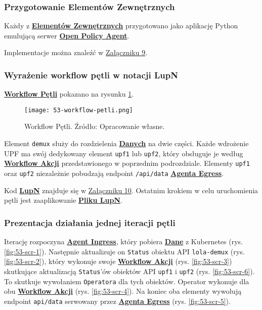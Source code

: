 \subsubsection{Przygotowanie Elementów Zewnętrznych}

Każdy z \hyperlink{def:element-zewnetrzny}{\textbf{Elementów Zewnętrznych}} przygotowano jako aplikację Python emulującą serwer \hyperlink{def:opa}{\textbf{Open Policy Agent}}.

Implementacje można znaleźć w \hyperlink{appendix:9}{Załączniku 9}.

\subsubsection{Wyrażenie workflow pętli w notacji LupN}

\hyperlink{def:workflow-petli}{\textbf{Workflow Pętli}} pokazano na rysunku \ref{fig:53-workflow-petli}.

\begin{figure}[!h]
    \centering \texttt{[image: 53-workflow-petli.png]}
    \caption{Workflow Pętli. Źródło: Opracowanie własne.}\label{fig:53-workflow-petli}
\end{figure}

Element \texttt{demux} służy do rozdzielenia \hyperlink{def:dane}{\textbf{Danych}} na dwie części. Każde wdrożenie UPF ma swój dedykowany element \texttt{upf1} lub \texttt{upf2}, który obsługuje je według \hyperlink{def:workflow-petli}{\textbf{Workflow Akcji}} przedstawionego w poprzednim podrozdziale. Elementy \texttt{upf1} oraz \texttt{upf2} niezależnie pobudzają endpoint \texttt{/api/data} \hyperlink{def:agent-egress}{\textbf{Agenta Egress}}.

Kod \hyperlink{def:lupn}{\textbf{LupN}} znajduje się w \hyperlink{appendix:10}{Załączniku 10}. Ostatnim krokiem w celu uruchomienia pętli jest zaaplikowanie \hyperlink{def:plik-lupn}{\textbf{Pliku LupN}}.

\subsubsection{Prezentacja działania jednej iteracji pętli}

Iterację rozpoczyna \hyperlink{def:agent-ingress}{\textbf{Agent Ingress}}, który pobiera \hyperlink{def:dane}{\textbf{Dane}} z Kubernetes (rys. \ref{fig:53-scr-1}). Następnie aktualizuje on \texttt{Status} obiektu API \texttt{lola-demux} (rys. \ref{fig:53-scr-2}), który wykonuje swoje \hyperlink{def:workflow-petli}{\textbf{Workflow Akcji}} (rys. \ref{fig:53-scr-3}) skutkujące aktualizacją \texttt{Status}'ów obiektów API \texttt{upf1} i \texttt{upf2} (rys. \ref{fig:53-scr-6}). To skutkuje wywołaniem \texttt{Operatora} dla tych obiektów. Operator wykonuje dla obu \hyperlink{def:workflow-petli}{\textbf{Workflow Akcji}} (rys. \ref{fig:53-scr-4}). Na koniec oba elementy wywołują endpoint \texttt{api/data} serwowany przez \hyperlink{def:agent-egress}{\textbf{Agenta Egress}} (rys. \ref{fig:53-scr-5}).


